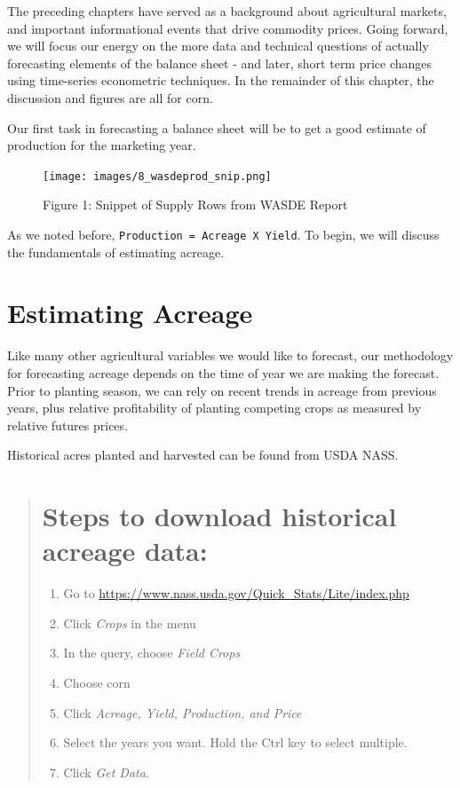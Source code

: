 \documentclass[
]{book}
\providecommand{\tightlist}{%
  \setlength{\itemsep}{0pt}\setlength{\parskip}{0pt}}
\begin{document}
The preceding chapters have served as a background about agricultural markets, and important informational events that drive commodity prices. Going forward, we will focus our energy on the more data and technical questions of actually forecasting elements of the balance sheet - and later, short term price changes using time-series econometric techniques. In the remainder of this chapter, the discussion and figures are all for corn.

Our first task in forecasting a balance sheet will be to get a good estimate of production for the marketing year.

\begin{figure}
\centering
\texttt{[image: images/8\_wasdeprod\_snip.png]}
\caption{Figure 1: Snippet of Supply Rows from WASDE Report}
\end{figure}

As we noted before, \texttt{Production\ =\ Acreage\ X\ Yield}. To begin, we will discuss the fundamentals of estimating acreage.

\hypertarget{estimating-acreage}{%
\section{Estimating Acreage}\label{estimating-acreage}}

Like many other agricultural variables we would like to forecast, our methodology for forecasting acreage depends on the time of year we are making the forecast. Prior to planting season, we can rely on recent trends in acreage from previous years, plus relative profitability of planting competing crops as measured by relative futures prices.

Historical acres planted and harvested can be found from USDA NASS.

\begin{quote}
\hypertarget{steps-to-download-historical-acreage-data}{%
\section{Steps to download historical acreage data:}\label{steps-to-download-historical-acreage-data}}

\begin{enumerate}
\def\labelenumi{\arabic{enumi}.}
\tightlist
\item
  Go to \url{https://www.nass.usda.gov/Quick_Stats/Lite/index.php}
\item
  Click \emph{Crops} in the menu
\item
  In the query, choose \emph{Field Crops}
\item
  Choose corn
\item
  Click \emph{Acreage, Yield, Production, and Price}
\item
  Select the years you want. Hold the Ctrl key to select multiple.
\item
  Click \emph{Get Data}.
\end{enumerate}
\end{quote}
\end{document}
